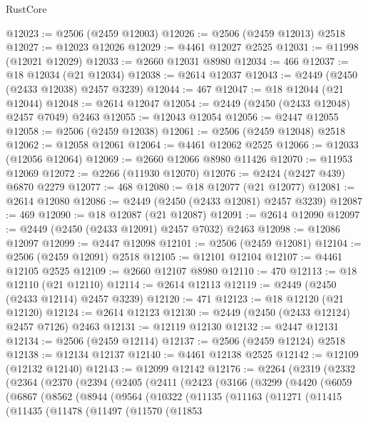 \begin{lexlean}{RustCore}
\begin{coremodule}
@12023 := @2506 (@2459 @12003)
@12026 := @2506 (@2459 @12013) @2518
@12027 := @12023 @12026
@12029 := @4461 @12027 @2525
@12031 := @11998 (@12021 @12029)
@12033 := @2660 @12031 @8980
@12034 := 466
@12037 := @18 @12034 (@21 @12034)
@12038 := @2614 @12037
@12043 := @2449 (@2450 (@2433 @12038) @2457 @3239)
@12044 := 467
@12047 := @18 @12044 (@21 @12044)
@12048 := @2614 @12047
@12054 := @2449 (@2450 (@2433 @12048) @2457 @7049) @2463
@12055 := @12043 @12054
@12056 := @2447 @12055
@12058 := @2506 (@2459 @12038)
@12061 := @2506 (@2459 @12048) @2518
@12062 := @12058 @12061
@12064 := @4461 @12062 @2525
@12066 := @12033 (@12056 @12064)
@12069 := @2660 @12066 @8980 @11426
@12070 := @11953 @12069
@12072 := @2266 (@11930 @12070)
@12076 := @2424 (@2427 @439) @6870 @2279
@12077 := 468
@12080 := @18 @12077 (@21 @12077)
@12081 := @2614 @12080
@12086 := @2449 (@2450 (@2433 @12081) @2457 @3239)
@12087 := 469
@12090 := @18 @12087 (@21 @12087)
@12091 := @2614 @12090
@12097 := @2449 (@2450 (@2433 @12091) @2457 @7032) @2463
@12098 := @12086 @12097
@12099 := @2447 @12098
@12101 := @2506 (@2459 @12081)
@12104 := @2506 (@2459 @12091) @2518
@12105 := @12101 @12104
@12107 := @4461 @12105 @2525
@12109 := @2660 @12107 @8980
@12110 := 470
@12113 := @18 @12110 (@21 @12110)
@12114 := @2614 @12113
@12119 := @2449 (@2450 (@2433 @12114) @2457 @3239)
@12120 := 471
@12123 := @18 @12120 (@21 @12120)
@12124 := @2614 @12123
@12130 := @2449 (@2450 (@2433 @12124) @2457 @7126) @2463
@12131 := @12119 @12130
@12132 := @2447 @12131
@12134 := @2506 (@2459 @12114)
@12137 := @2506 (@2459 @12124) @2518
@12138 := @12134 @12137
@12140 := @4461 @12138 @2525
@12142 := @12109 (@12132 @12140)
@12143 := @12099 @12142
@12176 := @2264
    (@2319
      (@2332
        (@2364
          (@2370
            (@2394
              (@2405
                (@2411
                  (@2423
                    (@3166
                      (@3299
                        (@4420
                          (@6059
                            (@6867
                              (@8562
                                (@8944
                                  (@9564
                                    (@10322
                                      (@11135
                                        (@11163
                                          (@11271
                                            (@11415
                                              (@11435
                                                (@11478
                                                  (@11497
                                                    (@11570
                                                      (@11853

\end{coremodule}
\end{lexlean}
